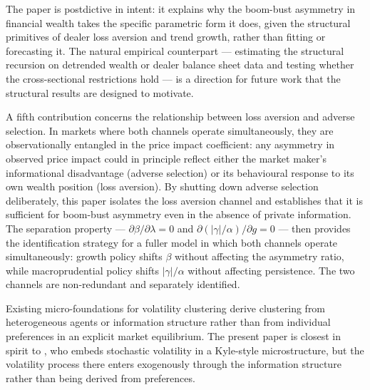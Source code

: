 \documentclass[12pt,a4paper]{article}
\theoremstyle{definition}
\begin{document}
The paper is postdictive in intent: it explains why the boom-bust asymmetry
in financial wealth takes the specific parametric form it does, given the
structural primitives of dealer loss aversion and trend growth, rather than
fitting or forecasting it. The natural empirical counterpart --- estimating
the structural recursion on detrended wealth or dealer balance sheet data
and testing whether the cross-sectional restrictions hold --- is a direction
for future work that the structural results are designed to motivate.

A fifth contribution concerns the relationship between loss aversion and
adverse selection. In markets where both channels operate simultaneously,
they are observationally entangled in the price impact coefficient: any
asymmetry in observed price impact could in principle reflect either the
market maker's informational disadvantage (adverse selection) or its
behavioural response to its own wealth position (loss aversion). By
shutting down adverse selection deliberately, this paper isolates the loss
aversion channel and establishes that it is sufficient for boom-bust
asymmetry even in the absence of private information. The separation
property --- $\partial\beta/\partial\lambda = 0$ and $\partial(|\gamma|/\alpha)/\partial g = 0$
--- then provides the identification strategy for a fuller model in which
both channels operate simultaneously: growth policy shifts $\beta$ without
affecting the asymmetry ratio, while macroprudential policy shifts
$|\gamma|/\alpha$ without affecting persistence. The two channels are
non-redundant and separately identified.

Existing micro-foundations for volatility clustering \citep{brock1998,follmer2005,watanabe2008} derive clustering
from heterogeneous agents or information structure rather than from individual
preferences in an explicit market equilibrium. The present paper is closest
in spirit to \citet{watanabe2008}, who embeds stochastic volatility in a
Kyle-style microstructure, but the volatility process there enters
exogenously through the information structure rather than being derived
from preferences.
\end{document}
